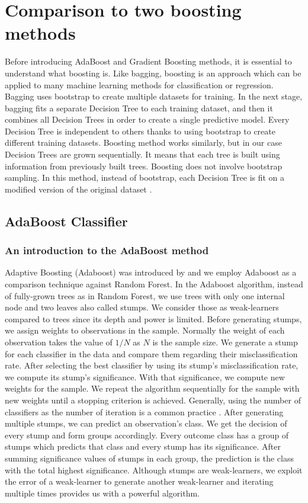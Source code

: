 \section{Comparison to two boosting methods}
Before introducing AdaBoost and Gradient Boosting methods, 
it is essential to understand what boosting is. 
Like bagging, boosting is an approach which can be applied to many machine learning methods for 
classification or regression. Bagging uses bootstrap to create multiple datasets for training. 
In the next stage, bagging fits a separate Decision Tree to each training dataset, 
and then it combines all Decision Trees in order to create a single predictive model. 
Every Decision Tree is independent to others thanks to using bootstrap to create different training datasets. 
Boosting method works similarly, but in our case Decision Trees are grown sequentially. 
It means that each tree is built using information from previously built trees. 
Boosting does not involve bootstrap sampling. 
In this method, instead of bootstrap, each Decision Tree is fit on a modified version of 
the original dataset \cite{James2013}.

\subsection{AdaBoost Classifier}
\label{sec:adaboost}

\subsubsection{An introduction to the AdaBoost method}
Adaptive Boosting (Adaboost) was introduced by \cite{freund1997boosting} and we employ Adaboost as a comparison 
technique against Random Forest. In the Adaboost algorithm, instead of fully-grown trees as in Random Forest, 
we use trees with only one internal node and two leaves also called stumps. We consider those as weak-learners 
compared to trees since its depth and power is limited. Before generating stumps, 
we assign weights to observations in the sample. Normally the weight of each observation takes the value 
of $1/N$ as $N$ is the sample size. We generate a stump for each classifier in the data and compare them regarding 
their misclassification rate. After selecting the best classifier by using its stump's misclassification rate,
we compute its stump's significance. With that significance, we compute new weights for the sample. 
We repeat the algorithm sequentially for the sample with new weights until a stopping criterion is achieved. 
Generally, using the number of classifiers as the number of iteration is a common practice \cite{friedman2001elements}. 
After generating multiple stumps, we can predict an observation's class. 
We get the decision of every stump and form groups accordingly. 
Every outcome class has a group of stumps which predicts that class and every stump has its significance. 
After summing significance values of stumps in each group, the prediction is the class with the total highest significance. 
Although stumps are weak-learners, we exploit the error of a weak-learner to generate another weak-learner 
and iterating multiple times provides us with a powerful algorithm.

